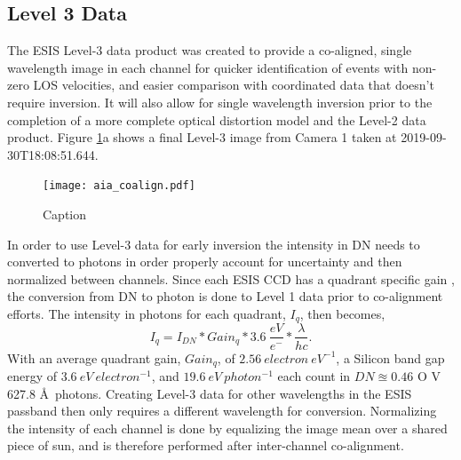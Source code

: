     \subsection{Level 3 Data}
 
    
    	\newcommand{\vigfit}{[0.44, 0.34, 0.38, 0.5]}
    	\newcommand{\levthreetime}{2019-09-30T18:08:51.644}
    	
    	
    	The ESIS Level-3 data product was created to provide a co-aligned, single wavelength image in each channel for quicker identification of events with non-zero LOS velocities, and easier comparison with coordinated data that doesn't require inversion. 
    	It will also allow for single wavelength inversion prior to the completion of a more complete optical distortion model and the Level-2 data product.
    	Figure \ref{fig:coalign}a shows a final Level-3 image from Camera 1 taken at \levthreetime.
    	
  		\begin{figure}[htb!]
    		\centering
    		\texttt{[image: aia\_coalign.pdf]}
    		\caption{Caption}
    		\label{fig:coalign}
    	\end{figure}
    	
    
     	In order to use Level-3 data for early inversion the intensity in DN needs to  converted to photons in order properly account for uncertainty and then normalized between channels.
   		Since each ESIS CCD has a quadrant specific gain \citep{ESIS}, the conversion from DN to photon is done to Level 1 data prior to co-alignment efforts.
   		The intensity in photons for each quadrant, $I_q$, then becomes,
   		\begin{equation}
	   		I_q = I_{DN} * Gain_q * 3.6\ \frac{eV}{e^{-}} * \frac{\lambda}{hc}.
   		\end{equation}
   		With an average quadrant gain, $Gain_q$, of $2.56\ electron\ eV^{-1}$, a Silicon band gap energy of $3.6\ eV\ electron^{-1}$, and $19.6\ eV\ photon^{-1}$ each count in $DN \approxeq 0.46$ O V 627.8 \AA \ photons.
   		Creating Level-3 data for other wavelengths in the ESIS passband then only requires a different wavelength for conversion.
   		Normalizing the intensity of each channel is done by equalizing the image mean over a shared piece of sun, and is therefore performed after inter-channel co-alignment.
   		
